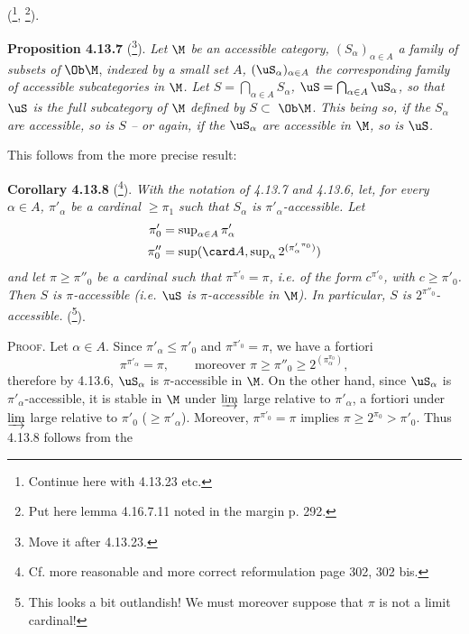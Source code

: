 (\footnote[119]{Continue here with 4.13.23 etc.}, \footnote[120]{Put here lemma 4.16.7.11 noted in the margin p. 292.}).

\textbf{Proposition 4.13.7} (\footnote[121]{Move it after 4.13.23.}). \textit{Let $\M$ be an accessible category, $(S_\alpha)_{\alpha\in A}$ a family of subsets of} $\Ob\M$, \textit{indexed by a small set $A$, $(\uS_\alpha)_{\alpha\in A}$ the corresponding family of accessible subcategories in $\M$. Let $S = \bigcap_{\alpha\in A} S_\alpha$, $\uS = \bigcap_{\alpha\in A} \uS_\alpha$, so that $\uS$ is the full subcategory of $\M$ defined by $S \subset$} $\Ob\M$. \textit{This being so, if the $S_\alpha$ are accessible, so is $S$ – or again, if the $\uS_\alpha$ are accessible in $\M$, so is $\uS$.}

This follows from the more precise result:

\textbf{Corollary 4.13.8} (\footnote[122]{Cf. more reasonable and more correct reformulation page 302, 302 bis.}). \textit{With the notation of 4.13.7 and 4.13.6, let, for every $\alpha \in A$, $\pi'_\alpha$ be a cardinal $\geqslant \pi_1$ such that $S_\alpha$ is $\pi'_\alpha$-accessible. Let}
\[
\begin{aligned}
\pi'_0 &= \sup\nolimits_{\alpha\in A} \pi'_\alpha \\
\pi''_0 &= \sup(\card A, \sup\nolimits_\alpha 2^{({\pi'_\alpha}^{\pi_0})})
\end{aligned}
\]
\textit{and let $\pi \geqslant \pi''_0$ be a cardinal such that $\pi^{\pi'_0} = \pi$, i.e. of the form $c^{\pi'_0}$, with $c \geqslant \pi'_0$. Then $S$ is $\pi$-accessible (i.e. $\uS$ is $\pi$-accessible in $\M$). In particular, $S$ is $2^{\pi''_0}$-accessible.} (\footnote[123]{This looks a bit outlandish! We must moreover suppose that $\pi$ is not a limit cardinal!}).

\textsc{Proof}. Let $\alpha \in A$. Since $\pi'_\alpha \leqslant \pi'_0$ and $\pi^{\pi'_0} = \pi$, we have a fortiori
\[
\pi^{\pi'_\alpha} = \pi , \qquad \text{moreover } \pi \geqslant \pi''_0 \geqslant 2^{(\pi_\alpha^{\pi_0})} , %
\]
therefore by 4.13.6, $\uS_\alpha$ is $\pi$-accessible in $\M$. On the other hand, since $\uS_\alpha$ is $\pi'_\alpha$-accessible, it is stable in $\M$ under $\varinjlim$ large relative to $\pi'_\alpha$, a fortiori under $\varinjlim$ large relative to $\pi'_0$ ($\geqslant \pi'_\alpha$). Moreover, $\pi^{\pi'_0} = \pi$ implies $\pi \geqslant 2^{\pi_0} > \pi'_0$. Thus 4.13.8 follows from the

